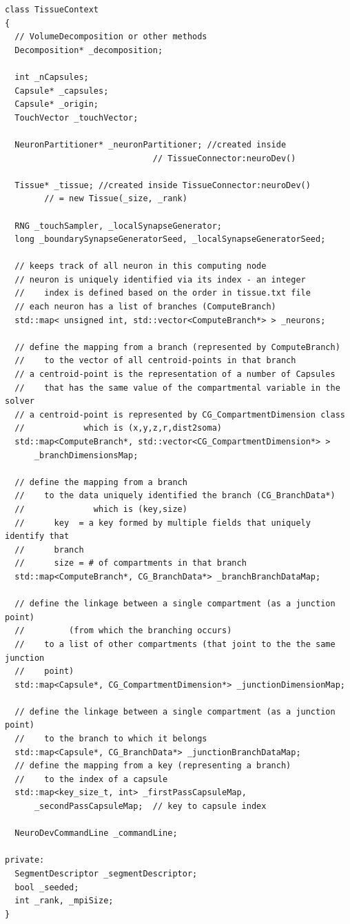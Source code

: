 \begin{lstlisting}
class TissueContext
{
  // VolumeDecomposition or other methods
  Decomposition* _decomposition; 

  int _nCapsules;
  Capsule* _capsules;  
  Capsule* _origin;
  TouchVector _touchVector;

  NeuronPartitioner* _neuronPartitioner; //created inside 
                              // TissueConnector:neuroDev()
                              
  Tissue* _tissue; //created inside TissueConnector:neuroDev()
        // = new Tissue(_size, _rank)
  
  RNG _touchSampler, _localSynapseGenerator;
  long _boundarySynapseGeneratorSeed, _localSynapseGeneratorSeed;

  // keeps track of all neuron in this computing node
  // neuron is uniquely identified via its index - an integer
  //    index is defined based on the order in tissue.txt file
  // each neuron has a list of branches (ComputeBranch)
  std::map<	unsigned int, std::vector<ComputeBranch*> > _neurons;

  // define the mapping from a branch (represented by ComputeBranch)
  //    to the vector of all centroid-points in that branch
  // a centroid-point is the representation of a number of Capsules
  //    that has the same value of the compartmental variable in the solver
  // a centroid-point is represented by CG_CompartmentDimension class
  //            which is (x,y,z,r,dist2soma)
  std::map<ComputeBranch*, std::vector<CG_CompartmentDimension*> >
      _branchDimensionsMap;
  
  // define the mapping from a branch
  //    to the data uniquely identified the branch (CG_BranchData*)
  //              which is (key,size)
  //      key  = a key formed by multiple fields that uniquely identify that
  //      branch
  //      size = # of compartments in that branch
  std::map<ComputeBranch*, CG_BranchData*> _branchBranchDataMap;
  
  // define the linkage between a single compartment (as a junction point)
  //         (from which the branching occurs)
  //    to a list of other compartments (that joint to the the same junction
  //    point)
  std::map<Capsule*, CG_CompartmentDimension*> _junctionDimensionMap;
  
  // define the linkage between a single compartment (as a junction point)
  //    to the branch to which it belongs
  std::map<Capsule*, CG_BranchData*> _junctionBranchDataMap;
  // define the mapping from a key (representing a branch)
  //    to the index of a capsule
  std::map<key_size_t, int> _firstPassCapsuleMap,
      _secondPassCapsuleMap;  // key to capsule index

  NeuroDevCommandLine _commandLine;
  
private:
  SegmentDescriptor _segmentDescriptor;
  bool _seeded;
  int _rank, _mpiSize;
}
\end{lstlisting}

